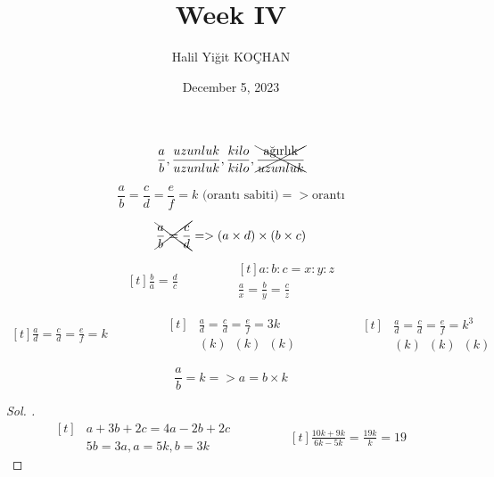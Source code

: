 \documentclass{article}
\title{Week IV}
\author{Halil Yiğit KOÇHAN}
\date{December 5, 2023}
\theoremstyle{mytheoremstyle}
\theoremstyle{mytheoremstyle}
\theoremstyle{myproblemstyle}
\begin{document}
    \maketitle

\begin{align*}
  \frac{a}{b}, \frac{uzunluk}{uzunluk}, \frac{kilo}{kilo}, \xcancel{\frac{\text{ağırlık}}{uzunluk}}
\end{align*}

$$ \frac{a}{b} = \frac{c}{d} = \frac{e}{f} = k \text{ (orantı sabiti)} => \text{orantı} $$

$$ \cancel{\bcancel{\frac{a}{b} = \frac{c}{d}}} => (a \times d) \times (b \times c) $$

\begin{equation*}
  \begin{aligned}[t]
    \frac{b}{a} = \frac{d}{c}
  \end{aligned}
  \qquad\qquad
  \begin{aligned}[t]
    a : b : c = x : y : z\\
    \frac{a}{x} = \frac{b}{y} = \frac{c}{z}
  \end{aligned}
\end{equation*}

\begin{equation*}
  \begin{aligned}[t]
    \frac{a}{d} = \frac{c}{d} = \frac{e}{f} = k
  \end{aligned}
  \qquad\qquad
  \begin{aligned}[t]
    &\frac{a}{d} = \frac{c}{d} = \frac{e}{f} = 3k\\
    &(k)\;\ (k)\;\ (k)\;\
  \end{aligned}
  \qquad\qquad
  \begin{aligned}[t]
    &\frac{a}{d} = \frac{c}{d} = \frac{e}{f} = k^3\\
    &(k)\;\ (k)\;\ (k)\;\
  \end{aligned}
\end{equation*}

$$ \frac{a}{b} = k => a = b \times k $$

\begin{problem}[$ \frac{a + 3b + 2c}{2a - b + c} = 2 $ ise $ \frac{2a + 3b}{2b - a} = ? $]
\end{problem}

\begin{proof}[\textit{ Sol. }]
  \begin{equation*}
    \begin{aligned}[t]
      &a + 3b + 2c = 4a - 2b + 2c\\
      &5b = 3a, a = 5k, b = 3k
    \end{aligned}
    \qquad\qquad
    \begin{aligned}[t]
      \frac{10k + 9k}{6k - 5k} = \frac{19k}{k} = 19
    \end{aligned}
  \end{equation*}
\end{proof}
\end{document}
